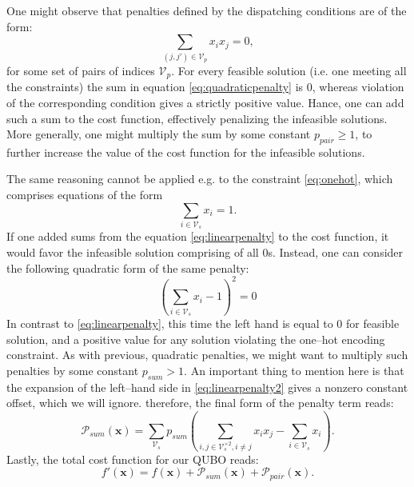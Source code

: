 One might observe that penalties defined by the dispatching conditions are of the form:
\begin{equation}
  \label{eq:quadraticpenalty}
  \sum_{(j, j') \in \mathcal{V}_{p}} x_{i}x_{j} = 0,
\end{equation}
for some set of pairs of indices $\mathcal{V}_{p}$. For every feasible solution (i.e. one meeting all the constraints) the sum in equation \eqref{eq:quadraticpenalty} is 0, whereas violation of the corresponding condition gives a strictly
positive value. Hance, one can add such a sum to the cost function, effectively penalizing the infeasible solutions.
More generally, one might multiply the sum by some constant $p_{pair} \ge 1$, to further increase the value of the
cost function for the infeasible solutions.

The same reasoning cannot be applied e.g. to the constraint \eqref{eq:onehot}, which comprises equations of the form
\begin{equation}
  \label{eq:linearpenalty}
  \sum_{i \in \mathcal{V}_{s}}x_{i} = 1.
\end{equation}
If one added sums from the equation \eqref{eq:linearpenalty} to the cost function, it would favor the infeasible solution
comprising of all 0s. Instead, one can consider the following quadratic form of the same penalty:
\begin{equation}
  \label{eq:linearpenalty2}
    \left(\sum_{i \in \mathcal{V}_{s}}x_{i} -1 \right)^{2} = 0
  \end{equation}
  In contrast to \eqref{eq:linearpenalty}, this time the left hand is equal to 0 for feasible solution, and a positive value for any solution violating the one--hot encoding constraint. As with previous, quadratic penalties, we might want to multiply such penalties by some constant $p_{sum} > 1$. An important thing to mention here is that the expansion of the left--hand side in \eqref{eq:linearpenalty2} gives a nonzero constant offset, which we will ignore.
  therefore, the final form of the penalty term reads:
  \begin{equation}
    \mathcal{P}_{sum}(\mathbf{x}) = \sum_{\mathcal{V}_{s}}p_{sum}\left(\sum_{i,j \in \mathcal{V}_{s}^{\times 2}, i\ne j} x_{i}x_{j}  - \sum_{i \in \mathcal{V}_{s}}x_{i}\right).
  \end{equation}
  Lastly, the total cost function for our QUBO reads:
  \begin{equation}
    f'(\mathbf{x}) = f(\mathbf{x}) + \mathcal{P}_{sum}(\mathbf{x}) + \mathcal{P}_{pair}(\mathbf{x}).
  \end{equation}
